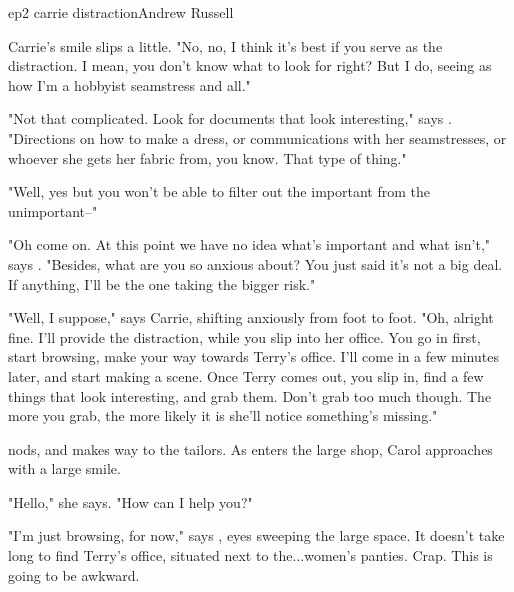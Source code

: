 \documentclass{book}
\begin{document}
\begin{childnode}{ep2 carrie distraction}{Andrew Russell}


    Carrie's smile slips a little. "No, no, I think it's best if you serve as the distraction. I mean, you don't know what to look for right? But I do, seeing as how I'm a hobbyist seamstress and 
    all."

    "Not that complicated. Look for documents that look interesting," says \name{}. "Directions on how to make a dress, or communications with her seamstresses, or whoever she gets her fabric from,
    you know. That type of thing."

    "Well, yes but you won't be able to filter out the important from the unimportant--"

    "Oh come on. At this point we have no idea what's important and what isn't," says \name{}. "Besides, what are you so anxious about? You just said it's not a big deal. If anything, I'll be
    the one taking the bigger risk."

    "Well, I suppose," says Carrie, shifting anxiously from foot to foot. "Oh, alright fine. I'll provide the distraction, while you slip into her office. You go in first, start browsing, make
    your way towards Terry's office. I'll come in a few minutes later, and start making a scene. Once Terry comes out, you slip in, find a few things that look interesting, and grab them. Don't
    grab too much though. The more you grab, the more likely it is she'll notice something's missing."

    \name{} nods, and makes \hisher{} way to the tailors. As \heshe{} enters the large shop, Carol approaches with a large smile.

    "Hello," she says. "How can I help you?" 

    "I'm just browsing, for now," says \name{}, \hisher{} eyes sweeping the large space. It doesn't take \himher{} long to find Terry's office, situated next to the...women's panties. 
              {Crap. This is going to be awkward.}


\end{childnode}
\end{document}
